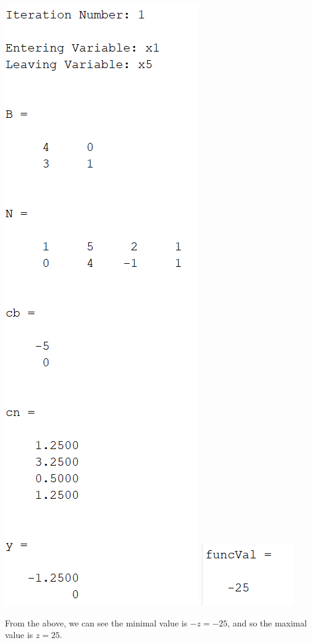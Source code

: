 \documentclass{article}
\begin{document}
\begin{itemize}
\begin{center}
        \includegraphics[scale = 0.7]{2_2_ii_iter1}
        \newline
        \includegraphics[scale = 1]{2_2_ii_min}
    \end{center}
    From the above, we can see the minimal value is $-z = -25$, and so the maximal value is $z = 25$.


\end{itemize}
\end{document}
